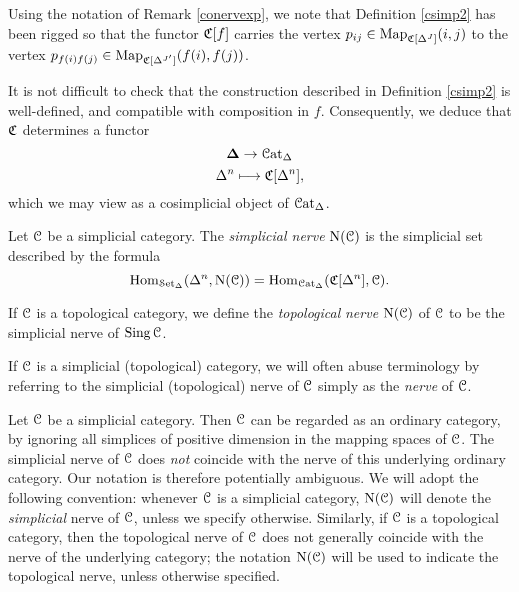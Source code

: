 \begin{remark}
Using the notation of Remark \ref{conervexp}, we note that Definition \ref{csimp2} has been rigged so that the functor $\operatorname{\mathfrak{C}}[f]$ carries the vertex $p_{ij}
\in \operatorname{{Map}}_{\operatorname{\mathfrak{C}}[ \Delta^J ]}(i,j)$ to the vertex
$p_{f(i) f(j)} \in \operatorname{{Map}}_{\operatorname{\mathfrak{C}}[\Delta^{J'}]}(f(i), f(j))$.
\end{remark}

It is not difficult to check that the construction described in
Definition \ref{csimp2} is well-defined, and compatible with composition in $f$.
Consequently, we deduce that $\operatorname{\mathfrak{C}}$ determines a functor
$$ \operatorname{{\bf \Delta}} \rightarrow \operatorname{\mathcal{C}at_{\Delta}}$$
$$ \Delta^n \longmapsto \operatorname{\mathfrak{C}}[ \Delta^n ],$$
which we may view as a cosimplicial object of $\operatorname{\mathcal{C}at_{\Delta}}$.

\begin{definition}\label{topnerve}
Let $\operatorname{\mathcal{C}}$ be a simplicial category. The {\it simplicial nerve}
$\operatorname{N}(\operatorname{\mathcal{C}})$ is the simplicial set described by the
formula
$$ \operatorname{Hom}_{ \operatorname{\mathcal{S}et_{\Delta}}}( \Delta^n, \operatorname{N}(\operatorname{\mathcal{C}})) =
\operatorname{Hom}_{\operatorname{\mathcal{C}at_{\Delta}}}( \operatorname{\mathfrak{C}}[ \Delta^n ], \operatorname{\mathcal{C}}).$$ 

If $\operatorname{\mathcal{C}}$ is a topological category, we define the {\it
topological} {\it nerve} $\operatorname{N}(\operatorname{\mathcal{C}})$ of $\operatorname{\mathcal{C}}$ to be the
simplicial nerve of $\operatorname{Sing} \operatorname{\mathcal{C}}$.
\end{definition}

\begin{remark}
If $\operatorname{\mathcal{C}}$ is a simplicial (topological) category, we will often abuse terminology by referring to the 
simplicial (topological) nerve of $\operatorname{\mathcal{C}}$ simply as the {\em nerve} of $\operatorname{\mathcal{C}}$. 
\end{remark}

\begin{warning}
Let $\operatorname{\mathcal{C}}$ be a simplicial category. Then $\operatorname{\mathcal{C}}$ can be regarded as an ordinary category, by ignoring all simplices of positive dimension in the mapping spaces of $\operatorname{\mathcal{C}}$. The simplicial nerve of $\operatorname{\mathcal{C}}$ does {\em not} coincide with the nerve of this underlying ordinary category. Our notation is therefore potentially ambiguous. We will adopt the following convention: whenever $\operatorname{\mathcal{C}}$ is a simplicial category, $\operatorname{N}(\operatorname{\mathcal{C}})$ will denote the {\em simplicial} nerve of $\operatorname{\mathcal{C}}$, unless we specify otherwise. Similarly, if $\operatorname{\mathcal{C}}$ is a topological category, then the topological nerve
of $\operatorname{\mathcal{C}}$ does not generally coincide with the nerve of the underlying category; the notation
$\operatorname{N}(\operatorname{\mathcal{C}})$ will be used to indicate the topological nerve, unless otherwise specified.
\end{warning}

